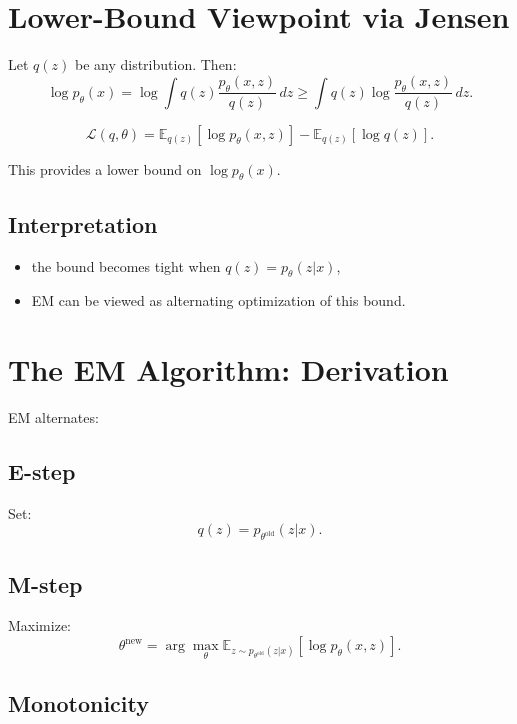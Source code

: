 \section{Lower-Bound Viewpoint via Jensen}

Let $q(z)$ be any distribution. Then:
\[
\log p_\theta(x)
= \log \int q(z)\frac{p_\theta(x,z)}{q(z)}\,dz
\ge
\int q(z)\log \frac{p_\theta(x,z)}{q(z)}\,dz.
\]

\begin{definition}
\[
\mathcal{L}(q,\theta)
=
\mathbb{E}_{q(z)}[\log p_\theta(x,z)]
-
\mathbb{E}_{q(z)}[\log q(z)].
\]
\end{definition}

This provides a lower bound on $\log p_\theta(x)$.

\subsection{Interpretation}

\begin{itemize}
    \item the bound becomes tight when $q(z)=p_\theta(z|x)$,
    \item EM can be viewed as alternating optimization of this bound.
\end{itemize}

\section{The EM Algorithm: Derivation}

EM alternates:

\subsection{E-step}

Set:
\[
q(z) = p_{\theta^{\text{old}}}(z|x).
\]

\subsection{M-step}

Maximize:
\[
\theta^{\text{new}} = \arg\max_\theta
\mathbb{E}_{z \sim p_{\theta^{\text{old}}}(z|x)}
[\log p_\theta(x,z)].
\]

\subsection{Monotonicity}

